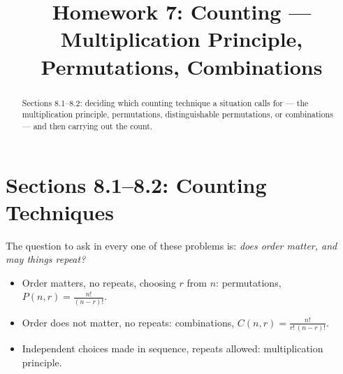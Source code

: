 \documentclass[12pt]{ximera}
\title{Homework 7: Counting --- Multiplication Principle, Permutations, Combinations}
\begin{document}
\begin{abstract}
Sections 8.1--8.2: deciding which counting technique a situation calls for --- the
multiplication principle, permutations, distinguishable permutations, or combinations --- and then carrying out the
count.
\end{abstract}
\maketitle

\section*{Sections 8.1--8.2: Counting Techniques}

The question to ask in every one of these problems is: \emph{does order matter, and
may things repeat?}
\begin{itemize}
\item Order matters, no repeats, choosing $r$ from $n$: permutations,
      $P(n,r)=\frac{n!}{(n-r)!}$.
\item Order does not matter, no repeats: combinations,
      $C(n,r)=\frac{n!}{r!\,(n-r)!}$.
\item Independent choices made in sequence, repeats allowed: multiplication
      principle.
\end{itemize}
\end{document}

